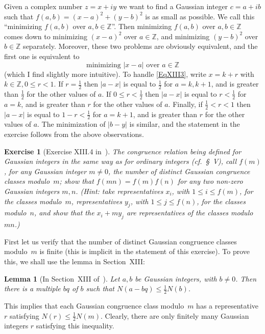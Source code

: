 \documentclass[12pt,letterpaper]{article}
\newcommand{\Z}{\mathbb{Z}}
\newtheorem{lem}[thm]{Lemma} %
\newtheorem{exer}[thm]{Exercise}
\theoremstyle{definition}
\begin{document}
Given a complex number $z=x+iy$ we want to find a Gaussian integer $c=a+ib$ such that $f(a,b)=(x-a)^2+(y-b)^2$ is as small as possible. We call this ``minimizing $f(a,b)$ over $a, b\in\Z$''. Then minimizing $f(a,b)$ over $a, b\in\Z$ comes down to minimizing $(x-a)^2$ over $a\in\Z$, and minimizing $(y-b)^2$ over $b\in\Z$ separately. Moreover, these two problems are obviously equivalent, and the first one is equivalent to 
\begin{equation}\label{EqXIII3} 
\text{minimizing $|x-a|$ over $a\in\Z$}
\end{equation} 
(which I find slightly more intuitive). To handle \eqref{EqXIII3}, write $x=k+r$ with $k\in\Z,0\le r<1$. If $r=\frac{1}{2}$ then $|a-x|$ is equal to $\frac{1}{2}$ for $a=k,k+1$, and is greater than $\frac{1}{2}$ for the other values of $a$. If $0\le r<\frac{1}{2}$ then $|a-x|$ is equal to $r<\frac{1}{2}$ for $a=k$, and is greater than $r$ for the other values of $a$. Finally, if $\frac{1}{2}<r<1$ then $|a-x|$ is equal to $1-r<\frac{1}{2}$ for $a=k+1$, and is greater than $r$ for the other values of $a$. The minimization of $|b-y|$ is similar, and the statement in the exercise follows from the above observations. 

\begin{exer}[Exercise XIII.4 in~\cite{weil1979}]\label{ExXIII4}
The congruence relation being defined for Gaussian integers in the same way as for ordinary integers (cf.\ \S~V), call $f(m)$, for any Gaussian integer $m\neq 0$, the number of distinct Gaussian congruence classes modulo~$m$; show that $f(mn)=f(m)f(n)$ for any two non-zero Gaussian integers $m,n$. (Hint: take representatives $x_i$, with $1\le i\le f(m)$, for the classes modulo~$m$, representatives $y_j$, with $1\le j\le f(n)$, for the classes modulo~$n$, and show that the $x_i+my_j$ are representatives of the classes modulo~$mn$.)
\end{exer}

First let us verify that the number of distinct Gaussian congruence classes modulo~$m$ is finite (this is implicit in the statement of this exercise). To prove this, we shall use the lemma in Section~XIII: 

\begin{lem}[In Section~XIII of~\cite{weil1979}]\label{L-XIII}
Let $a, b$ be Gaussian integers, with $b\ne0$. Then there is a multiple $bq$ of $b$ such that $N(a-bq)\le\frac{1}{2} N(b)$. 
\end{lem} 

This implies that each Gaussian congruence class modulo~$m$ has a representative $r$ satisfying $N(r)\le\frac{1}{2} N(m)$. Clearly, there are only finitely many Gaussian integers $r$ satisfying this inequality. 
\end{document}
